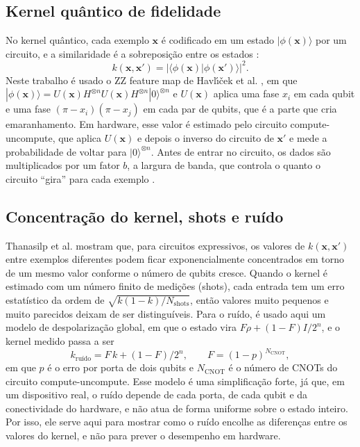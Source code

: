 \documentclass[conference]{IEEEtran}
\begin{document}
\subsection{Kernel quântico de fidelidade}
No kernel quântico, cada exemplo $\mathbf{x}$ é codificado em um estado $|\phi(\mathbf{x})\rangle$ por um circuito, e a similaridade é a sobreposição entre os estados \cite{havlicek2019,schuld2019}:
\begin{equation}
k(\mathbf{x},\mathbf{x}') = |\langle\phi(\mathbf{x})|\phi(\mathbf{x}')\rangle|^2 .
\end{equation}
Neste trabalho é usado o ZZ feature map de Havl\'{\i}\v{c}ek et al. \cite{havlicek2019}, em que $|\phi(\mathbf{x})\rangle = U(\mathbf{x})H^{\otimes n}U(\mathbf{x})H^{\otimes n}|0\rangle^{\otimes n}$ e $U(\mathbf{x})$ aplica uma fase $x_i$ em cada qubit e uma fase $(\pi - x_i)(\pi - x_j)$ em cada par de qubits, que é a parte que cria emaranhamento. Em hardware, esse valor é estimado pelo circuito compute-uncompute, que aplica $U(\mathbf{x})$ e depois o inverso do circuito de $\mathbf{x}'$ e mede a probabilidade de voltar para $|0\rangle^{\otimes n}$. Antes de entrar no circuito, os dados são multiplicados por um fator $b$, a largura de banda, que controla o quanto o circuito ``gira'' para cada exemplo \cite{shaydulin2021}.

\subsection{Concentração do kernel, shots e ruído}
Thanasilp et al. \cite{thanasilp2024} mostram que, para circuitos expressivos, os valores de $k(\mathbf{x},\mathbf{x}')$ entre exemplos diferentes podem ficar exponencialmente concentrados em torno de um mesmo valor conforme o número de qubits cresce. Quando o kernel é estimado com um número finito de medições (shots), cada entrada tem um erro estatístico da ordem de $\sqrt{k(1-k)/N_{\mathrm{shots}}}$, então valores muito pequenos e muito parecidos deixam de ser distinguíveis. Para o ruído, é usado aqui um modelo de despolarização global, em que o estado vira $F\rho + (1-F)I/2^n$, e o kernel medido passa a ser
\begin{equation}
k_{\text{ruído}} = F\,k + (1-F)/2^n, \qquad F = (1-p)^{N_{\mathrm{CNOT}}},
\end{equation}
em que $p$ é o erro por porta de dois qubits e $N_{\mathrm{CNOT}}$ é o número de CNOTs do circuito compute-uncompute. Esse modelo é uma simplificação forte, já que, em um dispositivo real, o ruído depende de cada porta, de cada qubit e da conectividade do hardware, e não atua de forma uniforme sobre o estado inteiro. Por isso, ele serve aqui para mostrar como o ruído encolhe as diferenças entre os valores do kernel, e não para prever o desempenho em hardware.
\end{document}
